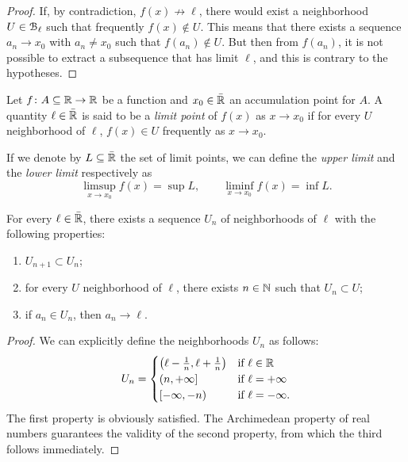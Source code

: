 %
\begin{proof}
  If, by contradiction, $f(x) \not\to \ell$,
  there would exist a neighborhood $U\in \mathcal B_\ell$
  such that frequently $f(x) \not \in U$.
  This means that there exists a sequence
  $a_n\to x_0$ with $a_n\neq x_0$ such that $f(a_n)\not \in U$.
  But then from $f(a_n)$,
  it is not possible to extract a subsequence
  that has limit $\ell$, and this is contrary to the
  hypotheses.
\end{proof}

\begin{definition}
  Let $f\colon A\subseteq {\mathbb R} \to {\mathbb R}$ be a function and $x_0\in \bar {{\mathbb R}}$ 
  an accumulation point for $A$.
  A quantity $\ell\in \bar{{\mathbb R}}$ is said to be
  a \emph{limit point}%
%
 of $f(x)$ as $x\to x_0$ if 
  for every $U$ neighborhood of $\ell$, $f(x)\in U$ 
  frequently as $x\to x_0$.
  
  If we denote by $L\subseteq \bar{{\mathbb R}}$ the set
  of limit points, we can define the \emph{upper limit} and the
  \emph{lower limit}
  respectively as
  \[
  \limsup_{x\to x_0} f(x) = \sup L, \qquad
  \liminf_{x\to x_0} f(x) = \inf L.
  \]
\end{definition}
  
\begin{proposition}%
  \label{prop:base_numerabile}%
    For every $\ell\in \bar {{\mathbb R}}$, there exists a sequence $U_n$ of neighborhoods
  of $\ell$
  with the following properties:
  \begin{enumerate}
    \item $U_{n+1}\subset U_n$;
    \item for every $U$ neighborhood of $\ell$, there exists $n\in {\mathbb N}$ such that $U_n\subset U$;
    \item if $a_n\in U_n$, then $a_n\to \ell$.
  \end{enumerate}
\end{proposition}
\begin{proof}
We can explicitly define the neighborhoods $U_n$ as follows:
\[
  U_n = 
  \begin{cases}
    \left(\ell-\frac 1 n,\ell+\frac 1 n\right) & \text{if $\ell\in {\mathbb R}$}\\ 
    \left(n,+\infty\right] & \text{if $\ell=+\infty$}\\
    \left[-\infty,-n\right) & \text{if $\ell=-\infty$.}
  \end{cases}
\]
The first property is obviously satisfied.
The Archimedean property of real numbers guarantees the validity of the second 
property, from which the third follows immediately.
\end{proof}

